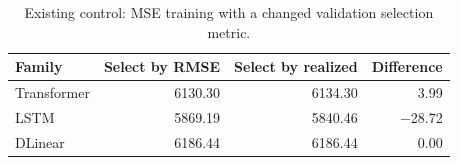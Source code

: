 \begin{table}[!htbp]
\centering\small
\caption{Existing control: MSE training with a changed validation selection metric.}\label{tab:selection}
\begin{tabularx}{\linewidth}{@{}Xrrr@{}}
\toprule
Family & Select by RMSE & Select by realized & Difference \\
\midrule
Transformer & 6130.30 & 6134.30 & 3.99 \\
LSTM & 5869.19 & 5840.46 & $-$28.72 \\
DLinear & 6186.44 & 6186.44 & 0.00 \\
\bottomrule
\end{tabularx}
\par{}
\end{table}
